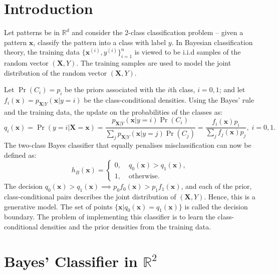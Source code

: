 \documentclass[11pt, a4 paper]{article}
\newcommand{\bx}{\mathbf{x}}
\newcommand{\bX}{\mathbf{X}}
\newcommand{\rr}{\mathbb{R}}
\begin{document}




\section*{Introduction}
\label{sec:intro}

Let patterns be in $\rr^d$ and consider the $2$-class classification problem -- given a pattern $\bx$, classify the pattern into a class with label $y$. In Bayesian classification theory, the training data $\{\bx^{(i)}, y^{(i)}\}_{i=1}^n$ is viewed to be i.i.d samples of the random vector $(\bX, Y)$. The training samples are used to model the joint distribution of the random vector $(\bX, Y)$.

Let $\Pr(C_i) = p_i$ be the priors associated with the $i$th class, $i=0,1$; and let $f_i(\bx) = p_{\bX\vert Y}(\bx \vert y=i)$ be the class-conditional densities. Using the Bayes' rule and the training data, the update on the probabilities of the classes as:
\begin{equation}
	q_i(\bx) = \Pr(y=i\vert \bX=\bx) = \frac{p_{\bX\vert Y}(\bx \vert y=i)\Pr(C_i)}{\sum_j p_{\bX\vert Y}(\bx \vert y=j)\Pr(C_j)} = \frac{f_i(\bx) p_i}{\sum_j f_j(\bx) p_j}, \; i=0,1.
\end{equation}
The two-class Bayes classifier that equally penalises misclassification can now be defined as:
\begin{equation}
	h_B(\bx) = \begin{cases}
		0, &\; q_{0}(\bx) > q_1(\bx), \\
		1, &\; \mathrm{otherwise}.
	\end{cases}
\label{eq:bayesClassifier}
\end{equation}
The decision $q_0(\bx) > q_1(\bx) \implies p_0 f_0(\bx) > p_1 f_1(\bx)$, and each of the prior, class-conditional pairs describes the joint distribution of $(\bX, Y)$. Hence, this is a generative model. The set of points $\{\bx \vert q_0(\bx) = q_1(\bx)\}$ is called the decision boundary. The problem of implementing this classifier is to learn the class-conditional densities and the prior densities from the training data.


\section{Bayes' Classifier in $\rr^{2}$}
\label{sec:bayes2D}
\end{document}
